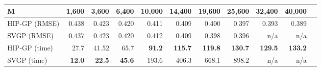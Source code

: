 \begin{tabular}{lrrrrrrrrrr}
    \toprule
    M &   1{,}600 & 3{,}600 & 6{,}400 & 10{,}000 & 14{,}400 & 19{,}600 &  25{,}600 & 32{,}400 & 40{,}000 \\
    \midrule
    HIP-GP (RMSE)& 0.438 &   0.423 &   0.420 &   0.411 & 0.409 & 0.400 &0.397 &0.393 & 0.389 \\
    SVGP (RMSE) & 0.437 &   0.423 &   0.420 &   0.412 & 0.409 & 0.398 &0.396 & n/a & n/a \\
    \midrule
    HIP-GP (time) & 27.7         &41.52          &65.7          &\textbf{91.2}  &\textbf{115.7} &\textbf{119.8} &\textbf{130.7} &\textbf{129.5} &\textbf{133.2} \\
    SVGP (time)   &\textbf{12.0} &\textbf{22.5} &\textbf{45.6} &193.6          &406.3 &668.1 &898.2 &n/a &n/a\\
    \bottomrule %
    \end{tabular}